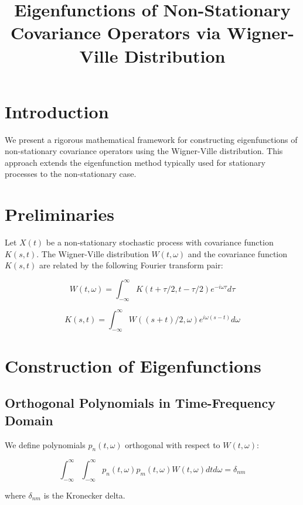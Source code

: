 \documentclass{article}
\title{Eigenfunctions of Non-Stationary Covariance Operators via Wigner-Ville Distribution}
\author{}
\date{}
\begin{document}
\maketitle

\section{Introduction}

We present a rigorous mathematical framework for constructing eigenfunctions of non-stationary covariance operators using the Wigner-Ville distribution. This approach extends the eigenfunction method typically used for stationary processes to the non-stationary case.

\section{Preliminaries}

Let $X(t)$ be a non-stationary stochastic process with covariance function $K(s,t)$. The Wigner-Ville distribution $W(t,\omega)$ and the covariance function $K(s,t)$ are related by the following Fourier transform pair:

\begin{equation}
W(t,\omega) = \int_{-\infty}^{\infty} K(t+\tau/2, t-\tau/2) e^{-i\omega\tau} d\tau
\end{equation}

\begin{equation}
K(s,t) = \int_{-\infty}^{\infty} W((s+t)/2, \omega) e^{i\omega(s-t)} d\omega
\end{equation}

\section{Construction of Eigenfunctions}

\subsection{Orthogonal Polynomials in Time-Frequency Domain}

We define polynomials $p_n(t,\omega)$ orthogonal with respect to $W(t,\omega)$:

\begin{equation}
\int_{-\infty}^{\infty}\int_{-\infty}^{\infty} p_n(t,\omega) p_m(t,\omega) W(t,\omega) dt d\omega = \delta_{nm}
\end{equation}

where $\delta_{nm}$ is the Kronecker delta.
\end{document}
